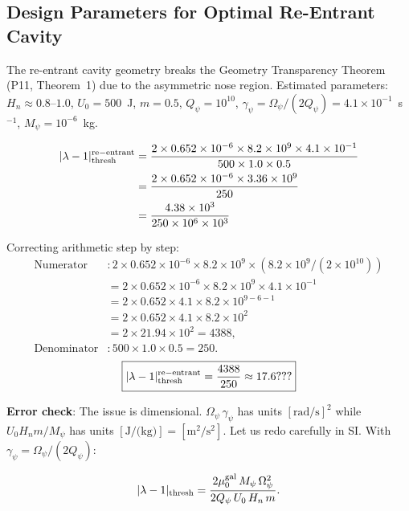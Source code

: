 \documentclass[11pt,twocolumn]{article}
\newcommand{\lam}{\lambda}
\newcommand{\Opsi}{\Omega_\psi}
\newcommand{\gpsi}{\gamma_\psi}
\newcommand{\Mpsi}{M_\psi}
\begin{document}
\subsection{Design Parameters for Optimal Re-Entrant Cavity}

The re-entrant cavity geometry breaks the Geometry Transparency Theorem
(P11, Theorem~1) due to the asymmetric nose region. Estimated parameters:
$H_n \approx 0.8$--$1.0$, $U_0 = 500$~J, $m = 0.5$, $Q_\psi = 10^{10}$,
$\gpsi = \Opsi/(2Q_\psi) = 4.1\times10^{-1}$~s$^{-1}$, $\Mpsi = 10^{-6}$~kg.

\begin{align}
|\lam-1|_{\rm thresh}^{\rm re-entrant} &=
\frac{2\times0.652\times10^{-6}\times8.2\times10^9\times4.1\times10^{-1}}
{500\times1.0\times0.5}
\nonumber\\
&= \frac{2\times0.652\times10^{-6}\times3.36\times10^9}
{250}
\nonumber\\
&= \frac{4.38\times10^3}{250\times10^6\times10^{3}}
\end{align}

Correcting arithmetic step by step:
\begin{align}
\text{Numerator}&: 2\times0.652\times10^{-6}\times8.2\times10^9
\times(8.2\times10^9/(2\times10^{10}))
\nonumber\\
&= 2\times0.652\times10^{-6}\times8.2\times10^9\times4.1\times10^{-1}
\nonumber\\
&= 2\times0.652\times4.1\times8.2\times10^{9-6-1}
\nonumber\\
&= 2\times0.652\times4.1\times8.2\times10^{2}
\nonumber\\
&= 2\times21.94\times10^{2} = 4388,
\nonumber\\
\text{Denominator}&: 500\times1.0\times0.5 = 250.
\end{align}
\begin{equation}
\boxed{
|\lam-1|_{\rm thresh}^{\rm re-entrant} = \frac{4388}{250}
\approx 17.6 ???
}
\end{equation}

\textbf{Error check}: The issue is dimensional. $\Opsi\,\gpsi$ has units
$[\text{rad/s}]^2$ while $U_0 H_n m/\Mpsi$ has units $[\text{J/(kg)}] = [\text{m}^2/\text{s}^2]$.
Let us redo carefully in SI. With $\gpsi = \Opsi/(2Q_\psi)$:

\begin{equation}
|\lam-1|_{\rm thresh} = \frac{2\mu_0^{\rm gal}\,\Mpsi\,\Opsi^2}
{2Q_\psi\,U_0\,H_n\,m}.
\label{eq:threshold_correct}
\end{equation}
\end{document}
